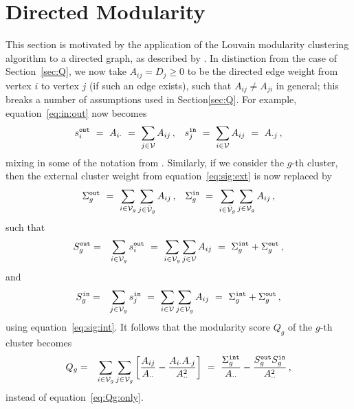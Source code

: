 \documentclass[a4paper]{article}
\begin{document}
\section{Directed Modularity}
This section is motivated by the application of the Louvain modularity clustering algorithm to a directed graph,
as described by \cite{browet14}.
In distinction from the case of Section~\ref{sec:Q}, we now take $A_{ij}=D_{j}\ge 0$ to be the directed edge weight from vertex $i$ to vertex $j$ (if such an
edge exists), such that $A_{ij}\ne A_{ji}$ in general; this breaks a number of assumptions used in Section\ref{sec:Q}.
For example, equation~\eqref{eq:in:out} now becomes
\begin{eqnarray}
  s^{\tt out}_i~=~A_{i\cdot}~=~\sum_{j\in{\cal V}} A_{ij}\,,&&
  s^{\tt in}_j~=~\sum_{i\in{\cal V}} A_{ij}~=~A_{\cdot j}\,,
\end{eqnarray}
mixing in some of the notation from \cite{browet14}.
Similarly, if we consider the $g$-th cluster, then the external cluster weight from equation~\eqref{eq:sig:ext} is now replaced by
\begin{eqnarray}
   \Sigma_g^{\tt out}~=~\sum_{i\in{\cal V}_g}\sum_{j\in\bar{\cal V}_g} A_{ij}\,, && 
   \Sigma_g^{\tt in}~=~\sum_{i\in\bar{\cal V}_g}\sum_{j\in{\cal V}_g} A_{ij}\,,
\end{eqnarray}
such that
\begin{eqnarray}
   S^{\tt out}_g & = & \sum_{i\in{\cal V}_g} s^{\tt out}_i~=~\sum_{i\in{\cal V}_g}\sum_{j\in{\cal V}}A_{ij}~=~\Sigma_g^{\tt int}+\Sigma_g^{\tt out}\,,
\end{eqnarray}
and
\begin{eqnarray}
   S^{\tt in}_g & = & \sum_{j\in{\cal V}_g} s^{\tt in}_j~=~\sum_{i\in{\cal V}}\sum_{j\in{\cal V}_g}A_{ij}~=~\Sigma_g^{\tt int}+\Sigma_g^{\tt out}\,,
\end{eqnarray}
using equation~\eqref{eq:sig:int}.
It follows that the modularity score $Q_g$ of the $g$-th cluster becomes
\begin{eqnarray}
   Q_g & = & \sum_{i\in{\cal V}_g}\sum_{j\in{\cal V}_g} \left[
  \frac{A_{ij}}{A_{\cdot\cdot}}-
  \frac{A_{i\cdot}A_{\cdot j}}{A_{\cdot\cdot}^2}
  \right]
~=~    \frac{\Sigma_g^{\tt int}}{A_{\cdot\cdot}}
    -\frac{S_g^{\tt out}S_g^{\tt in}}{A_{\cdot\cdot}^2}\,,
\end{eqnarray}
instead of equation~\eqref{eq:Qg:only}.
\end{document}
